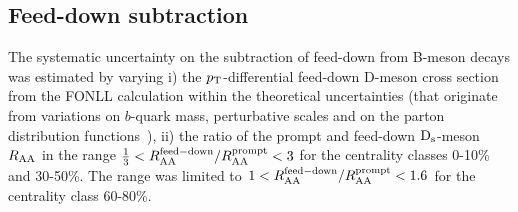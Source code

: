 \subsection{Feed-down subtraction}
The systematic uncertainty on the subtraction of feed-down from 
B-meson decays was estimated by varying i)
the $p_{\rm T}$-differential feed-down D-meson cross section from the 
FONLL calculation within the theoretical uncertainties (that originate from variations on 
$b$-quark mass, perturbative scales and on the parton distribution functions~\cite{Cacciari:2012ny}), 
ii) the ratio of the prompt and feed-down ${\rm D_s}$-meson $R_{\rm AA}$ in the 
range $\frac{1}{3} < R_{\rm AA}^{\rm  feed-down}/R_{\rm AA}^{\rm prompt} < 3$ 
for the centrality classes 0-10\% and 30-50\%. The range was limited to 
$1 < R_{\rm AA}^{\rm  feed-down} / R_{\rm AA}^{\rm prompt} < 1.6$ 
for the centrality class 60-80\%. 

